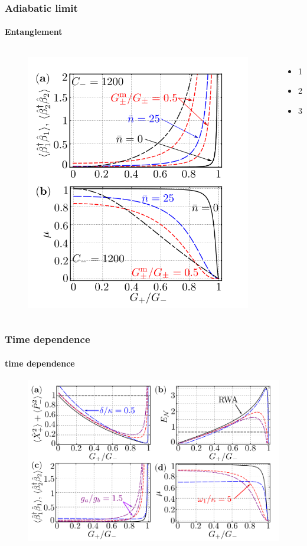 \documentclass[aspectratio=43]{beamer}
\begin{document}
\begin{frame}
	
	\frametitle{Adiabatic limit}
	\framesubtitle{Entanglement}
	
	\begin{columns}
		
		
		\begin{figure}
			\includegraphics[width = 6 cm]{plots/plot_steady_state.png}
		\end{figure}	
		
		
		\begin{itemize}
			\item 1
			\item 2
			\item 3
		\end{itemize}
		
	\end{columns}

\end{frame}

\begin{frame}

\frametitle{Time dependence}
\framesubtitle{time dependence}

	\begin{figure}
		\includegraphics[width = 9 cm]{plots/plot_time_dependence.png}
	\end{figure}	
	
\end{frame}
\end{document}
